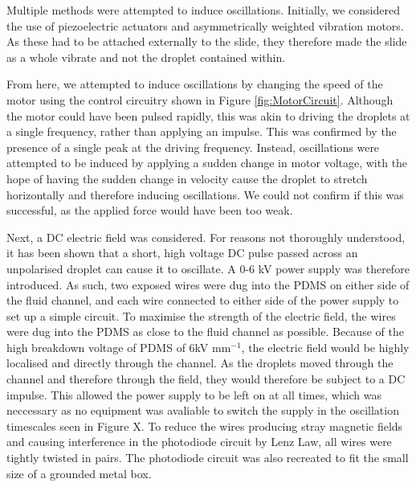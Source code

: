 \documentclass{physics_article_B}
\begin{document}
        Multiple methods were attempted to induce oscillations. Initially, we considered the use of piezoelectric actuators and asymmetrically weighted vibration motors. As these had to be attached externally to the slide, they therefore made the slide as a whole vibrate and not the droplet contained within. 
        
        From here, we attempted to induce oscillations by changing the speed of the motor using the control circuitry shown in Figure \ref{fig:MotorCircuit}. Although the motor could have been pulsed rapidly, this was akin to driving the droplets at a single frequency, rather than applying an impulse. This was confirmed by the presence of a single peak at the driving frequency. Instead, oscillations were attempted to be induced by applying a sudden change in motor voltage, with the hope of having the sudden change in velocity cause the droplet to stretch horizontally and therefore inducing oscillations. We could not confirm if this was successful, as the applied force would have been too weak. 
        
        Next, a DC electric field was considered. For reasons not thoroughly understood, it has been shown that a short, high voltage DC pulse passed across an unpolarised droplet can cause it to oscillate. A 0-6 kV power supply was therefore introduced. As such, two exposed wires were dug into the PDMS on either side of the fluid channel, and each wire connected to either side of the power supply to set up a simple circuit. To maximise the strength of the electric field, the wires were dug into the PDMS as close to the fluid channel as possible. Because of the high breakdown voltage of PDMS\cite{PDMSBreakdown} of 6kV mm$^{-1}$, the electric field would be highly localised and directly through the channel. As the droplets moved through the channel and therefore through the field, they would therefore be subject to a DC impulse. This allowed the power supply to be left on at all times, which was neccessary as no equipment was avaliable to switch the supply in the oscillation timescales seen in Figure X. To reduce the wires producing stray magnetic fields and causing interference in the photodiode circuit by Lenz Law, all wires were tightly twisted in pairs. The photodiode circuit was also recreated to fit the small size of a grounded metal box.
        
\end{document}
